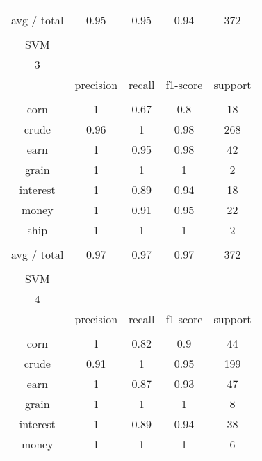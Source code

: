 \documentclass[11pt]{article}
\begin{document}
\begin{center}
\begin{longtable}{| c | c | c | c | c |}
           &           &        &          &         \\
avg / total & 0.95      & 0.95   & 0.94     & 372     \\
           &           &        &          &         \\
SVM         &           &        &          &         \\
3           &           &        &          &         \\
           & precision & recall & f1-score & support \\
           &           &        &          &         \\
corn        & 1         & 0.67   & 0.8      & 18      \\
crude       & 0.96      & 1      & 0.98     & 268     \\
earn        & 1         & 0.95   & 0.98     & 42      \\
grain       & 1         & 1      & 1        & 2       \\
interest    & 1         & 0.89   & 0.94     & 18      \\
money       & 1         & 0.91   & 0.95     & 22      \\
ship        & 1         & 1      & 1        & 2       \\
           &           &        &          &         \\
avg / total & 0.97      & 0.97   & 0.97     & 372     \\
           &           &        &          &         \\
SVM         &           &        &          &         \\
4           &           &        &          &         \\
           & precision & recall & f1-score & support \\
           &           &        &          &         \\
corn        & 1         & 0.82   & 0.9      & 44      \\
crude       & 0.91      & 1      & 0.95     & 199     \\
earn        & 1         & 0.87   & 0.93     & 47      \\
grain       & 1         & 1      & 1        & 8       \\
interest    & 1         & 0.89   & 0.94     & 38      \\
money       & 1         & 1      & 1        & 6       \\

\end{longtable}
\end{center}
\end{document}
